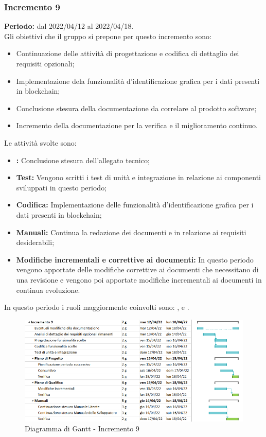 \subsubsection{Incremento 9} \label{subsubsection:incremento_9}
\textbf{Periodo:} dal 2022/04/12 al 2022/04/18.
\bigskip
\\Gli obiettivi che il gruppo si prepone per questo incremento sono:
\begin{itemize}
  \item Continuazione delle attività di progettazione e codifica di dettaglio dei requisiti opzionali;
  \item Implementazione dela funzionalità d'identificazione grafica per i dati presenti in blockchain\glo{};
  \item Conclusione stesura della documentazione da correlare al prodotto software;
  \item Incremento della documentazione per la verifica e il miglioramento continuo.
\end{itemize}
Le attività svolte sono:
\begin{itemize}
  \item \textbf{\PB{}:} Conclusione stesura dell’allegato tecnico;
  \item \textbf{Test:} Vengono scritti i test di unità e integrazione in relazione ai componenti sviluppati in questo periodo;
  \item \textbf{Codifica:} Implementazione delle funzionalità d'identificazione grafica per i dati presenti in blockchain\glo{};
  \item \textbf{Manuali:} Continua la redazione dei documenti \docNameVersionMU{} e \docNameVersionMS{} in relazione ai requisiti desiderabili;
  \item \textbf{Modifiche incrementali e correttive ai documenti:} In questo periodo vengono apportate delle modifiche correttive ai documenti che necessitano di una revisione e vengono poi apportate modifiche incrementali ai documenti in continua evoluzione.
\end{itemize}
In questo periodo i ruoli maggiormente coinvolti sono: \roleDesignerLow{}, \roleProgrammerLow{} e \roleVerifierLow{}.
\begin{figure}[H]
  \centering
  \includegraphics[scale=0.52]{immagini/incremento_9.png}
  \caption{Diagramma di Gantt - Incremento 9}
\end{figure}


